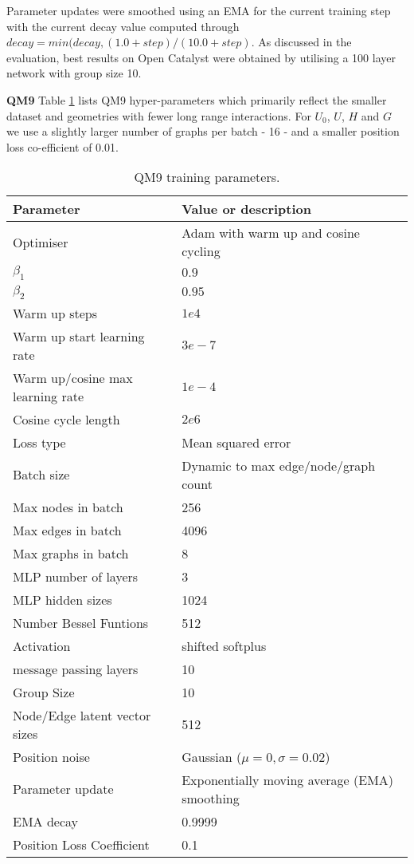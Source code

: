 \documentclass{article} \usepackage{iclr2022_conference,times}
\begin{document}
Parameter updates were smoothed using an EMA for the current training step with the current decay value computed through $ decay = min(decay, (1.0 + step) / (10.0 + step)$.
As discussed in the evaluation, best results on Open Catalyst were obtained by utilising a 100 layer network with group size 10.

\textbf{QM9}
Table \ref{qm9_params} lists QM9 hyper-parameters which primarily reflect the smaller dataset and geometries with fewer long range interactions. For $U_0$, $U$, $H$ and $G$ we use a slightly larger number of graphs per batch - 16 - and a smaller position loss co-efficient of 0.01. 

\begin{table}[]
\caption{QM9 training parameters.}
    \label{qm9_params}
    \centering
    \begin{tabular}{ll}
      \toprule
       Parameter & Value or description \\
       \midrule
       Optimiser & Adam with warm up and cosine cycling \\
       $\beta_1$   & $0.9$ \\              
       $\beta_2$   & $0.95$ \\                     
       Warm up steps    & $1e4$ \\
       Warm up start learning rate    & $3e-7$ \\       
       Warm up/cosine max learning rate    & $1e-4$ \\       
       Cosine cycle length    & $2e6$ \\       
       Loss type & Mean squared error \\
     \midrule
       Batch size & Dynamic to max edge/node/graph count \\
       Max nodes in batch & 256 \\
       Max edges in batch & 4096 \\   
       Max graphs in batch & 8 \\    
     \midrule
       MLP number of layers & 3 \\
       MLP hidden sizes & 1024 \\
       Number Bessel Funtions & 512 \\
       Activation & shifted softplus \\
       message passing layers & 10 \\
       Group Size & 10 \\
       Node/Edge latent vector sizes & 512 \\ 
     \midrule
       Position noise & Gaussian ($\mu=0, \sigma=0.02$) \\
       Parameter update & Exponentially moving average (EMA) smoothing \\
       EMA decay & 0.9999 \\
       Position Loss Coefficient & 0.1 \\
    \bottomrule

\end{tabular}
\end{table}
\end{document}
